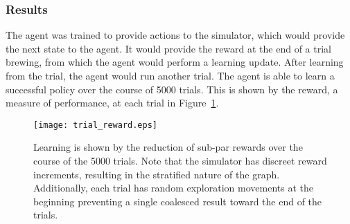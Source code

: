 \documentclass[draftclsnofoot,onecolumn,letterpaper,10pt]{IEEEtran}
\begin{document}
\subsubsection{Results}\label{sec:AI-Results}
The agent was trained to provide actions to the simulator, which would provide the next state to the agent. It would provide the reward at the end of a trial brewing, from which the agent would perform a learning update. After learning from the trial, the agent would run another trial. The agent is able to learn a successful policy over the course of 5000 trials. This is shown by the reward, a measure of performance, at each trial in Figure~\ref{fig:trial_graph}. 
\begin{figure}[h]
\label{fig:trial_graph}
\caption{Learning is shown by the reduction of sub-par rewards over the course of the 5000 trials. Note that the simulator has discreet reward increments, resulting in the stratified nature of the graph. Additionally, each trial has random exploration movements at the beginning preventing a single coalesced result toward the end of the trials.}
\texttt{[image: trial\_reward.eps]}
\end{figure}
\end{document}
